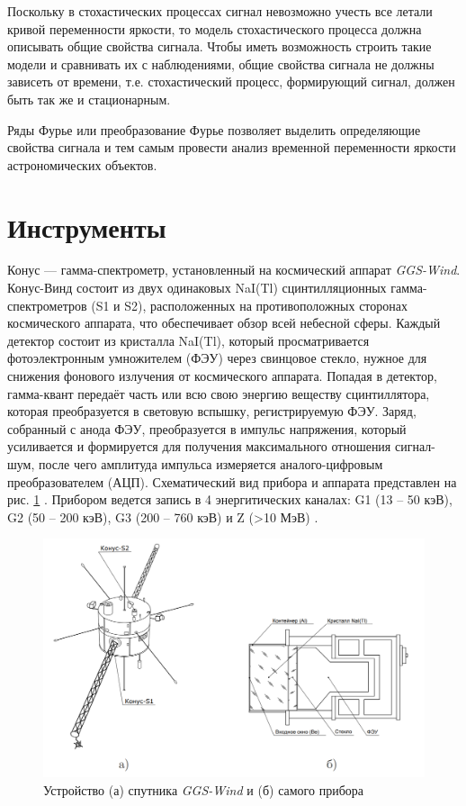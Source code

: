 		Поскольку в стохастических процессах сигнал невозможно учесть все летали кривой переменности яркости, то модель стохастического процесса должна описывать общие свойства сигнала. Чтобы иметь возможность
строить такие модели и сравнивать их с наблюдениями, общие свойства сигнала
не должны зависеть от времени, т.е. стохастический процесс, формирующий сигнал,
должен быть так же и стационарным.

		Ряды Фурье или преобразование Фурье позволяет выделить определяющие свойства сигнала и тем самым провести анализ временной переменности яркости астрономических объектов.
		
		\cite{m.vanderklis1988}

\section{Инструменты}
	
	Конус --- гамма-спектрометр, установленный на космический аппарат \textit{GGS-Wind}. Конус-Винд состоит из двух одинаковых NaI(Tl) сцинтилляционных гамма-спектрометров (S1 и S2), расположенных на противоположных сторонах космического аппарата, что обеспечивает обзор всей небесной сферы. Каждый детектор состоит из кристалла NaI(Tl), который  просматривается фотоэлектронным умножителем (ФЭУ) через свинцовое стекло, нужное для снижения фонового излучения от космического аппарата. Попадая в детектор, гамма-квант передаёт часть или всю свою энергию
веществу сцинтиллятора, которая преобразуется в световую вспышку, регистрируемую ФЭУ. Заряд, собранный с анода ФЭУ, преобразуется в импульс напряжения, который усиливается и формируется для получения максимального отношения сигнал-шум, после чего амплитуда импульса измеряется аналого-цифровым преобразователем (АЦП). Схематический вид прибора и аппарата представлен на рис. \ref{img:kw1} \cite{Svinkin_thesis}. Прибором ведется запись в 4 энергитических каналах: G1 (13 -- 50 кэВ), G2 (50 -- 200 кэВ), G3 (200 -- 760 кэВ) и Z (>10 МэВ) \cite{aptekarr.l.1993}.

	\begin{figure}[h!]
		\centering
		\includegraphics[width = 0.75\linewidth]{pictures/Konus-Wind.png}
		\caption{Устройство (а) спутника \textit{GGS-Wind} и (б) самого прибора}
		\label{img:kw1}
	\end{figure}
	
